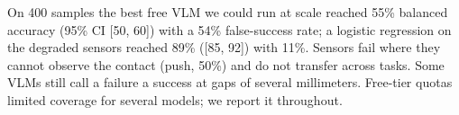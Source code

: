 On 400 samples the best free VLM we could run at scale reached 55\% balanced accuracy (95\% CI [50, 60]) with a 54\% false-success rate; a logistic regression on the degraded sensors reached 89\% ([85, 92]) with 11\%. Sensors fail where they cannot observe the contact (push, 50\%) and do not transfer across tasks. Some VLMs still call a failure a success at gaps of several millimeters. Free-tier quotas limited coverage for several models; we report it throughout.
